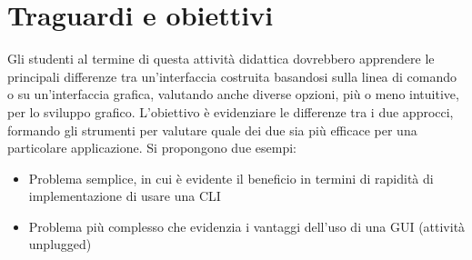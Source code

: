 \section{Traguardi e obiettivi}
Gli studenti al termine di questa attività didattica dovrebbero apprendere le principali differenze tra un'interfaccia costruita basandosi sulla linea di comando o su un'interfaccia grafica, valutando anche diverse opzioni, più o meno intuitive, per lo sviluppo grafico. L'obiettivo è evidenziare le differenze tra i due approcci, formando gli strumenti per valutare quale dei due sia più efficace per una particolare applicazione. 
Si propongono due esempi:
\begin{itemize}
\item Problema semplice, in cui è evidente il beneficio in termini di rapidità di implementazione di usare una CLI
\item Problema più complesso che evidenzia i vantaggi dell'uso di una GUI (attività unplugged)
\end{itemize}